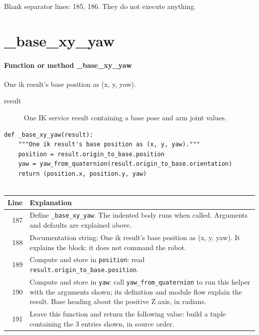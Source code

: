 \documentclass[11pt,a4paper]{book}
\begin{document}
Blank separator lines: 185, 186. They do not execute anything.

\section{\_base\_xy\_yaw}

\paragraph{Function or method \_base\_xy\_yaw}
One ik result's base position as (x, y, yaw).

\begin{description}
\item[result] One IK service result containing a base pose and arm joint values.
\end{description}

\begin{lstlisting}[firstnumber=187]
def _base_xy_yaw(result):
    """One ik result's base position as (x, y, yaw)."""
    position = result.origin_to_base.position
    yaw = yaw_from_quaternion(result.origin_to_base.orientation)
    return (position.x, position.y, yaw)


\end{lstlisting}

\begin{longtable}{r p{}}

\textbf{Line} & \textbf{Explanation} \\ \hline \endhead

187 & Define \texttt{\_base\_xy\_yaw}. The indented body runs when called. Arguments and defaults are explained above. \\

188 & Documentation string: One ik result's base position as (x, y, yaw). It explains the block; it does not command the robot. \\

189 & Compute and store in \texttt{position}: read \texttt{result.origin\_to\_base.position}.  \\

190 & Compute and store in \texttt{yaw}: call \texttt{yaw\_from\_quaternion} to run this helper with the arguments shown; its definition and module flow explain the result. Base heading about the positive Z axis, in radians. \\

191 & Leave this function and return the following value: build a tuple containing the 3 entries shown, in source order. \\

\end{longtable}
\end{document}
